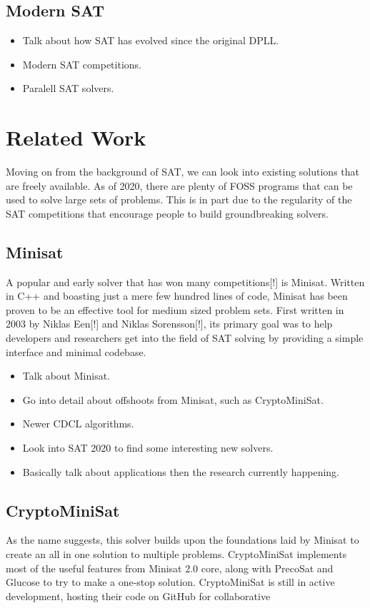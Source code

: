 \documentclass{article}
\begin{document}
\subsection{Modern SAT}
\begin{itemize}
    \item Talk about how SAT has evolved since the original DPLL.
    \item Modern SAT competitions.
    \item Paralell SAT solvers.
\end{itemize}

\section{Related Work}
Moving on from the background of SAT, we can look into existing solutions that are freely available.
As of 2020, there are plenty of FOSS programs that can be used to solve large sets of problems. This
is in part due to the regularity of the SAT competitions that encourage people to build
groundbreaking solvers.

\subsection{Minisat}
A popular and early solver that has won many competitions[!] is Minisat. Written in C++ and boasting
just a mere few hundred lines of code, Minisat has been proven to be an effective tool for medium
sized problem sets. First written in 2003 by Niklas Een[!] and Niklas Sorensson[!], its primary goal
was to help developers and researchers get into the field of SAT solving by providing a simple
interface and minimal codebase.

\begin{itemize}
    \item Talk about Minisat.
    \item Go into detail about offshoots from Minisat, such as CryptoMiniSat.
    \item Newer CDCL algorithms.
    \item Look into SAT 2020 to find some interesting new solvers.
    \item Basically talk about applications then the research currently happening.
\end{itemize}

\subsection{CryptoMiniSat}
As the name suggests, this solver builds upon the foundations laid by Minisat to create an all in
one solution to multiple problems. CryptoMiniSat implements most of the useful features from Minisat
2.0 core, along with PrecoSat and Glucose to try to make a one-stop solution. CryptoMiniSat is still
in active development, hosting their code on GitHub for collaborative
\end{document}
